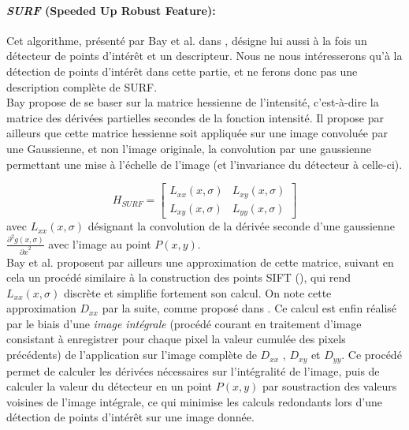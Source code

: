 \paragraph{\emph{SURF} (Speeded Up Robust Feature):\\}
Cet algorithme, présenté par Bay et al. dans \cite{Bay}, désigne lui aussi à la fois un détecteur de points d'intérêt et un descripteur. Nous ne nous intéresserons qu'à la détection de points d'intérêt dans cette partie, et ne ferons donc pas une description complète de SURF. \\
Bay propose de se baser sur la matrice hessienne de l'intensité, c'est-à-dire la matrice des dérivées partielles secondes de la fonction intensité. Il propose par ailleurs que cette matrice hessienne soit appliquée sur une image convoluée par une Gaussienne, et non l'image originale, la convolution par une gaussienne permettant une mise à l'échelle de l'image (et l'invariance du détecteur à celle-ci).

\begin{equation} \label{SURF_H}
	H_{SURF} = \left[ 
		\begin{array}{cc}
		L_{xx}(x, \sigma) & L_{xy}(x, \sigma) \\
		L_{xy}(x, \sigma) & L_{yy}(x, \sigma)  
		\end{array} 
	\right]
\end{equation}
avec $L_{xx}(x, \sigma)$ désignant la convolution de la dérivée seconde d'une gaussienne $\frac{\partial^2 g(x, \sigma)}{{\partial x}^2}$ avec l'image au point $P(x,y)$. \\

Bay  et al. proposent par ailleurs une approximation de cette matrice, suivant en cela un procédé similaire à la construction des points SIFT (\cite{Lowe1999a}), qui rend  $L_{xx}(x, \sigma)$ discrète et simplifie fortement son calcul. On note cette approximation $D_{xx}$ par la suite, comme proposé dans \cite{Bay}. Ce calcul est enfin réalisé par le biais d'une \emph{image intégrale} (procédé courant en traitement d'image consistant à enregistrer pour chaque pixel la valeur cumulée des pixels précédents) de l'application sur l'image complète de $D_{xx}$ ,  $D_{xy}$  et $D_{yy}$. Ce procédé permet de calculer les dérivées nécessaires sur l'intégralité de l'image, puis de calculer la valeur du détecteur en un point $P(x,y)$ par soustraction des valeurs voisines de l'image intégrale, ce qui minimise les calculs redondants lors d'une détection de points d'intérêt sur une image donnée.\\

